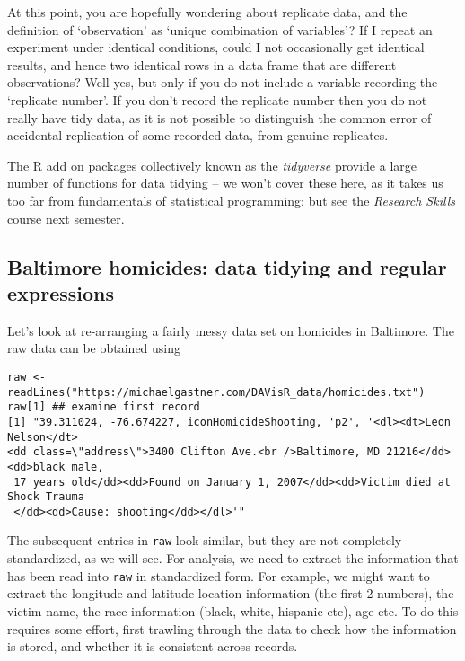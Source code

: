 \documentclass[10pt] {article}
\theoremstyle{definition}
\begin{document}
At this point, you are hopefully wondering about replicate data, and the definition of `observation' as `unique combination of variables'? If I repeat an experiment under identical conditions, could I not occasionally get identical results, and hence two identical rows in a data frame that are different observations? Well yes, but only if you do not include a variable recording the `replicate number'. If you don't record the replicate number then you do not really have tidy data, as it is not possible to distinguish the common error of accidental replication of some recorded data, from genuine replicates. 

The R add on packages collectively known as the {\em tidyverse} provide a large number of functions for data tidying -- we won't cover these here, as it takes us too far from fundamentals of statistical programming: but see the {\em Research Skills} course next semester.
 
\subsection{Baltimore homicides: data tidying and regular expressions}

Let's look at re-arranging a fairly messy data set on homicides in Baltimore. The raw data can be obtained using
\begin{lstlisting}
raw <- readLines("https://michaelgastner.com/DAVisR_data/homicides.txt")
raw[1] ## examine first record
[1] "39.311024, -76.674227, iconHomicideShooting, 'p2', '<dl><dt>Leon Nelson</dt>
<dd class=\"address\">3400 Clifton Ave.<br />Baltimore, MD 21216</dd><dd>black male,
 17 years old</dd><dd>Found on January 1, 2007</dd><dd>Victim died at Shock Trauma
 </dd><dd>Cause: shooting</dd></dl>'"
\end{lstlisting}
The subsequent entries in {\tt raw} look similar, but they are not completely standardized, as we will see.
For analysis, we need to extract the information that has been read into {\tt raw} in standardized form. For example, we might want to extract the longitude and latitude location information (the first 2 numbers), the victim name, the race information (black, white, hispanic etc), age etc. To do this requires some effort, first trawling through the data to check how the information is stored, and whether it is consistent across records.   
\end{document}
